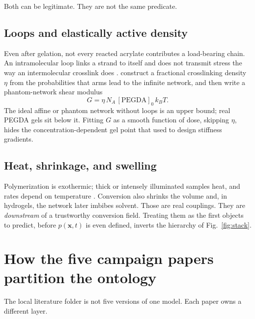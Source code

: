 Both can be legitimate.
They are not the same predicate.

\subsection{Loops and elastically active density}

Even after gelation, not every reacted acrylate contributes a load-bearing chain.
An intramolecular loop links a strand to itself and does not transmit stress the way an intermolecular crosslink does \citep{Zhong2016,Zhu2020}.
\citet{Zhu2020} construct a fractional crosslinking density $\eta$ from the probabilities that arms lead to the infinite network, and then write a phantom-network shear modulus
\begin{equation}
  G = \eta\,N_A\,[\mathrm{PEGDA}]_0\,k_B T.
  \label{eq:G}
\end{equation}
The ideal affine or phantom network without loops is an upper bound; real PEGDA gels sit below it.
Fitting $G$ as a smooth function of dose, skipping $\eta$, hides the concentration-dependent gel point that \citet{Zhu2020} used to design stiffness gradients.

\subsection{Heat, shrinkage, and swelling}

Polymerization is exothermic; thick or intensely illuminated samples heat, and rates depend on temperature \citep{Goodner2002,Dobson2024}.
Conversion also shrinks the volume and, in hydrogels, the network later imbibes solvent.
Those are real couplings.
They are \emph{downstream} of a trustworthy conversion field.
Treating them as the first objects to predict, before $p(\mathbf{x},t)$ is even defined, inverts the hierarchy of Fig.~\ref{fig:stack}.

\section{How the five campaign papers partition the ontology}

The local literature folder is not five versions of one model.
Each paper owns a different layer.

